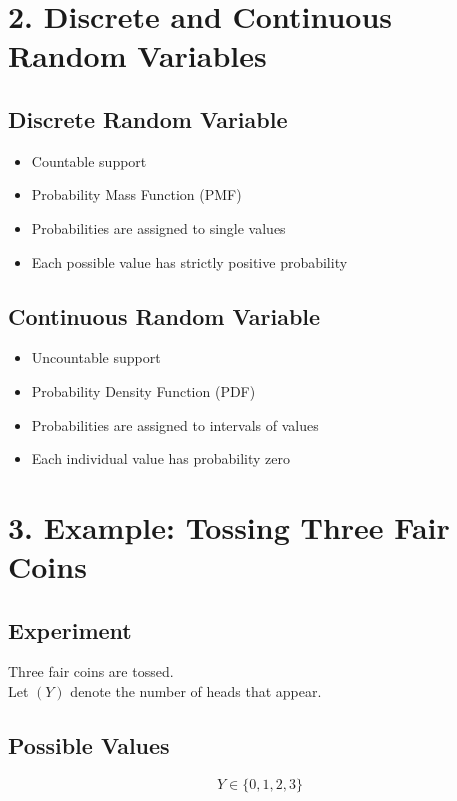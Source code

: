 \documentclass[11pt]{article}
\begin{document}
\section*{2. Discrete and Continuous Random Variables}

\subsection*{Discrete Random Variable}

\begin{itemize}
\item Countable support
\item Probability Mass Function (PMF)
\item Probabilities are assigned to single values
\item Each possible value has strictly positive probability
\end{itemize}

\subsection*{Continuous Random Variable}

\begin{itemize}
\item Uncountable support
\item Probability Density Function (PDF)
\item Probabilities are assigned to intervals of values
\item Each individual value has probability zero
\end{itemize}

\section*{3. Example: Tossing Three Fair Coins}

\subsection*{Experiment}

Three fair coins are tossed. \\
Let $(Y)$ denote the number of heads that appear.

\subsection*{Possible Values}

\[
Y \in \{0, 1, 2, 3\}
\]
\end{document}
